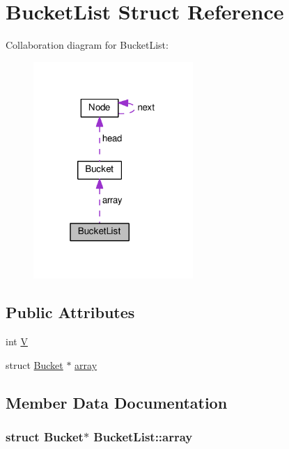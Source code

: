 \hypertarget{structBucketList}{}\section{Bucket\+List Struct Reference}
\label{structBucketList}


Collaboration diagram for Bucket\+List\+:
\nopagebreak
\begin{figure}[H]
\begin{center}
\leavevmode
\includegraphics[width=172pt]{structBucketList__coll__graph}
\end{center}
\end{figure}
\subsection*{Public Attributes}
\begin{DoxyCompactItemize}
\item 
int \hyperlink{structBucketList_a986196d1d435700557398237ad52fee9}{V}
\item 
struct \hyperlink{structBucket}{Bucket} $\ast$ \hyperlink{structBucketList_a55c205b2d67034433e98c4e96f39095e}{array}
\end{DoxyCompactItemize}


\subsection{Member Data Documentation}
\subsubsection[{\texorpdfstring{array}{array}}]{\setlength{\rightskip}{0pt plus 5cm}struct {\bf Bucket}$\ast$ Bucket\+List\+::array}\hypertarget{structBucketList_a55c205b2d67034433e98c4e96f39095e}{}\label{structBucketList_a55c205b2d67034433e98c4e96f39095e}
